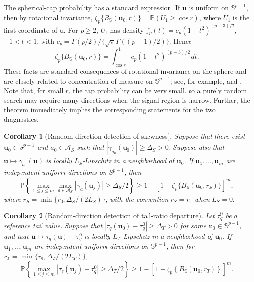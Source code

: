 \documentclass[11pt]{article}
\theoremstyle{plain}
\newtheorem{corollary}{Corollary}
\theoremstyle{definition}
\theoremstyle{remark}
\def\u{\bm{u}}
\newcommand{\Prob}{\mathbb{P}}
\newcommand{\abs}[1]{\left\lvert #1 \right\rvert}
\begin{document}
The spherical-cap probability has a standard expression. If $\u$ is uniform on \(\mathbb{S}^{p-1}\), then by rotational invariance, \(\zeta_p \{B_{\mathbb S}(\u_0,r)\}=\Prob(U_1\geqslant \cos r)\), where \(U_1\) is the first coordinate of $\u$. For \(p \geqslant 2\), \(U_1\) has density \(f_p(t)=c_p(1-t^2)^{(p-3)/2}\), \(-1<t<1\), with \(c_p=\Gamma(p/2)/\{\sqrt{\pi}\Gamma((p-1)/2)\}\). Hence
\[
\zeta_p \{B_{\mathbb S}(\u_0,r)\}
=
\int_{\cos r}^{1} c_p \left(1-t^2\right)^{(p-3)/2}\,dt .
\]
These facts are standard consequences of rotational invariance on the sphere and are closely related to concentration of measure on \(\mathbb{S}^{p-1}\); see, for example, \citet{ledoux2001concentration} and \citet{vershynin2018highdimensional}. Note that, for small \(r\), the cap probability can be very small, so a purely random search may require many directions when the signal region is narrow. Further, the theorem immediately implies the corresponding statements for the two diagnostics. 

\begin{corollary}[Random-direction detection of skewness]
	\label{cor:random_direction_skewness}
	Suppose that there exist \(\u_0\in S^{p-1}\) and \(a_0\in\mathcal A_S\) such that \(|\gamma_{a_0}(\u_0)|\geqslant \Delta_S>0.\) Suppose also that \(\u\mapsto \gamma_{a_0}(\u)\) is locally \(L_S\)-Lipschitz in a neighborhood of \(\u_0\). If \(\u_1,\ldots,\u_m\) are independent uniform
directions on \(S^{p-1}\), then
\[
\Prob\left\{
\max_{1\leqslant j\leqslant m}
\max_{a\in\mathcal A_S}
|\gamma_{a}(\u_j)|
\geqslant \Delta_S/2
\right\}
\ge
1-\left[1-\zeta_p\{B_{\mathbb S}(\u_0,r_S)\}\right]^m,
\]
where \(r_S=\min\{r_0,\Delta_S/(2L_S)\}\), with the convention \(r_S=r_0\) when \(L_S=0\).
\end{corollary}


\begin{corollary}[Random-direction detection of tail-ratio departure]
	\label{cor:random_direction_tail}
	Let \(\tau_q^0\) be a reference tail value. Suppose that \(\abs{\tau_q(\u_0)-\tau_q^0} \geqslant \Delta_T>0\) for some \(\u_0\in \mathbb{S}^{p-1}\), and that \(\u\mapsto\tau_q(\u)-\tau_q^0\) is locally \(L_T\)-Lipschitz in a neighborhood of \(\u_0\). If \(\u_1,\ldots,\u_m\) are independent uniform directions on \(\mathbb{S}^{p-1}\), then for \(r_T=\min\{r_0,\Delta_T/(2L_T)\}\),
	\[
	\Prob\left\{
	\max_{1\leqslant j\leqslant m} \abs{\tau_q(\u_j)-\tau_q^0}
	\geqslant \Delta_T/2
	\right\}
	\geqslant
	1-\left[1-\zeta_p \left\{B_{\mathbb S}(\u_0,r_T)\right\}\right]^m.
	\]
\end{corollary}
\end{document}
